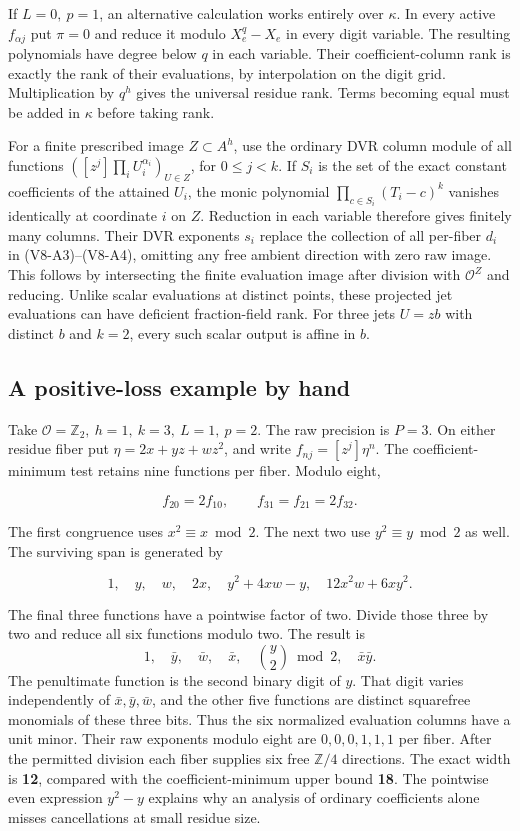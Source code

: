 \documentclass[
  11pt,
]{article}
\begin{document}
If \(L=0,\ p=1\), an alternative calculation works entirely over
\(\kappa\). In every active \(f_{\alpha j}\) put \(\pi=0\) and reduce it
modulo \(X_e^q-X_e\) in every digit variable. The resulting polynomials
have degree below \(q\) in each variable. Their coefficient-column rank
is exactly the rank of their evaluations, by interpolation on the digit
grid. Multiplication by \(q^h\) gives the universal residue rank. Terms
becoming equal must be added in \(\kappa\) before taking rank.

For a finite prescribed image \(Z\subset A^h\), use the ordinary DVR
column module of all functions
\(([z^j]\prod_i U_i^{\alpha_i})_{U\in Z}\), for \(0\le j<k\). If \(S_i\)
is the set of the exact constant coefficients of the attained \(U_i\),
the monic polynomial \(\prod_{c\in S_i}(T_i-c)^k\) vanishes identically
at coordinate \(i\) on \(Z\). Reduction in each variable therefore gives
finitely many columns. Their DVR exponents \(s_i\) replace the
collection of all per-fiber \(d_i\) in (V8-A3)--(V8-A4), omitting any free
ambient direction with zero raw image. This follows by intersecting the
finite evaluation image after division with \(\mathcal O^Z\) and
reducing. Unlike scalar evaluations at distinct points, these projected
jet evaluations can have deficient fraction-field rank. For three jets
\(U=zb\) with distinct \(b\) and \(k=2\), every such scalar output is
affine in \(b\).

\subsection{A positive-loss example by
hand}\label{v8-a-positive-loss-example-by-hand}

Take \(\mathcal O=\mathbb Z_2,\ h=1,\ k=3,\ L=1,\ p=2\). The raw
precision is \(P=3\). On either residue fiber put \(\eta=2x+yz+wz^2\),
and write \(f_{nj}=[z^j]\eta^n\). The coefficient-minimum test retains
nine functions per fiber. Modulo eight,

\[
 f_{20}=2f_{10},\qquad f_{31}=f_{21}=2f_{32}.
\]

The first congruence uses \(x^2\equiv x\bmod2\). The next two use
\(y^2\equiv y\bmod2\) as well. The surviving span is generated by

\[
        1,\quad y,\quad w,\quad 2x,\quad
        y^2+4xw-y,\quad 12x^2w+6xy^2 .
\]

The final three functions have a pointwise factor of two. Divide those
three by two and reduce all six functions modulo two. The result is \[
       1,\quad \bar y,\quad\bar w,\quad\bar x,\quad
       \binom{y}{2}\bmod2,\quad\bar x\bar y .
\] The penultimate function is the second binary digit of \(y\). That
digit varies independently of \(\bar x,\bar y,\bar w\), and the other
five functions are distinct squarefree monomials of these three bits.
Thus the six normalized evaluation columns have a unit minor. Their raw
exponents modulo eight are \(0,0,0,1,1,1\) per fiber. After the
permitted division each fiber supplies six free \(\mathbb Z/4\)
directions. The exact width is \textbf{12}, compared with the
coefficient-minimum upper bound \textbf{18}. The pointwise even
expression \(y^2-y\) explains why an analysis of ordinary coefficients
alone misses cancellations at small residue size.
\end{document}
